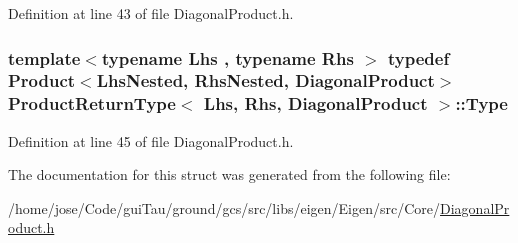 Definition at line 43 of file Diagonal\-Product.\-h.

\hypertarget{struct_product_return_type_3_01_lhs_00_01_rhs_00_01_diagonal_product_01_4_a23c0bc007978b098272c10609575f52e}{
\subsubsection[{Type}]{\setlength{\rightskip}{0pt plus 5cm}template$<$typename Lhs , typename Rhs $>$ typedef {\bf Product}$<${\bf Lhs\-Nested}, {\bf Rhs\-Nested}, {\bf Diagonal\-Product}$>$ {\bf Product\-Return\-Type}$<$ Lhs, Rhs, {\bf Diagonal\-Product} $>$\-::{\bf Type}}}\label{struct_product_return_type_3_01_lhs_00_01_rhs_00_01_diagonal_product_01_4_a23c0bc007978b098272c10609575f52e}


Definition at line 45 of file Diagonal\-Product.\-h.



The documentation for this struct was generated from the following file\-:\begin{DoxyCompactItemize}
\item 
/home/jose/\-Code/gui\-Tau/ground/gcs/src/libs/eigen/\-Eigen/src/\-Core/\hyperlink{_diagonal_product_8h}{Diagonal\-Product.\-h}\end{DoxyCompactItemize}
